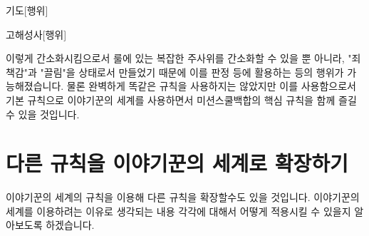 \documentclass{report}
\begin{document}
	\begin{story}{기도}{[행위]}
		
		
	\end{story}
	
	\begin{story}{고해성사}{[행위]}
		
		
	\end{story}
	
	이렇게 간소화시킴으로서 룰에 있는 복잡한 주사위를 간소화할 수 있을 뿐 아니라, "죄책감"과 "끌림"을 상태로서 만들었기 때문에 이를 판정 등에 활용하는 등의 행위가 가능해졌습니다. 물론 완벽하게 똑같은 규칙을 사용하지는 않았지만 이를 사용함으로서 기본 규칙으로 이야기꾼의 세계를 사용하면서 미션스쿨백합의 핵심 규칙을 함께 즐길 수 있을 것입니다.
	
	\iffalse
	또 다른 예시로 Call of Cthulhu의 경우에는 다음 이야기를 역할로 부여할 수 있을 것입니다:
	\begin{story}{점점 미쳐가는 이야기}{[세계][설화][광기]}
		이성치 100을 얻는다. 일반적으로 이해할 수 없는 일(살인, 시체, 고대의 존재 등)을 목격할때마다, 그 수준에 따라 난이도와 피해량(성공/실패, 다이스 사용 가능)을 시스템이 지정한다. 그러면 1d(현재 이성치)를 굴려, 해당 수치가 난이도 이상이라면 이성치에 성공 피해량을, 미만이라면 실패 피해량을 받는다. (e.g. 60[1d4/2d8]의 경우 주사위의 결과가 60 이상이 나오면 성공하며, 성공시 1d4 정신력, 실패시 2d8 정신력을 잃는다.)
		
		현재 이성치의 10\% 이상에 달하는 피해를 한번에 받은 이야기꾼은 해당 상황에 대한 이 시나리오에서의 [기피]를, 20\% 이상인 경우 이 시나리오에서의 [공포]를 얻는다. 25\% 이상인 경우, [공포]를 얻는 것은 같으나 이는 시나리오에서 벗어나도 유지된다. 이를 방지하기 위해 이성치에 받는 피해의 전부 또는 일부를 1대1의 비율로 정신력에 받을 수 있다.
	\end{story}
	\fi
	
	\section*{다른 규칙을 이야기꾼의 세계로 확장하기}
	이야기꾼의 세계의 규칙을 이용해 다른 규칙을 확장할수도 있을 것입니다. 이야기꾼의 세계를 이용하려는 이유로 생각되는 내용 각각에 대해서 어떻게 적용시킬 수 있을지 알아보도록 하겠습니다.
	
\end{document}
